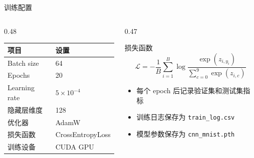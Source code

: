 \documentclass[aspectratio=169,10pt]{ctexbeamer}
\begin{document}
\begin{frame}{训练配置}
	\begin{columns}[T,onlytextwidth]
		\begin{column}{0.48\textwidth}
			\begin{table}
				\centering
				\small
				\begin{tabular}{l l}
					\toprule
					项目 & 设置 \\
					\midrule
					Batch size & 64 \\
					Epochs & 20 \\
					Learning rate & $5\times10^{-4}$ \\
					隐藏层维度 & 128 \\
					优化器 & AdamW \\
					损失函数 & CrossEntropyLoss \\
					训练设备 & CUDA GPU \\
					\bottomrule
				\end{tabular}
			\end{table}
		\end{column}
		\begin{column}{0.47\textwidth}
			\begin{block}{损失函数}
				\[
					\mathcal{L}=-\frac{1}{B}\sum_{i=1}^{B}
					\log \frac{\exp(z_{i,y_i})}{\sum_{c=0}^{9}\exp(z_{i,c})}
				\]
			\end{block}
			\begin{itemize}
				\item 每个 epoch 后记录验证集和测试集指标
				\item 训练日志保存为 \texttt{train\_log.csv}
				\item 模型参数保存为 \texttt{cnn\_mnist.pth}
			\end{itemize}
		\end{column}
	\end{columns}
\end{frame}
\end{document}

